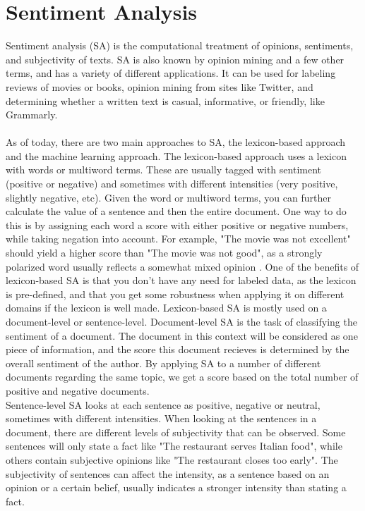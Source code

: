 \documentclass{report}
\begin{document}
\section{Sentiment Analysis}
Sentiment analysis (SA) is the computational treatment of opinions, sentiments, and subjectivity of texts. SA is also known by opinion mining and a few other terms, and has a variety of different applications. It can be used for labeling reviews of movies or books, opinion mining from sites like Twitter, and determining whether a written text is casual, informative, or friendly, like Grammarly.\\\\
As of today, there are two main approaches to SA, the lexicon-based approach and the machine learning approach. The lexicon-based approach uses a lexicon with words or multiword terms. These are usually tagged with sentiment (positive or negative) and sometimes with different intensities (very positive, slightly negative, etc). Given the word or multiword terms, you can further calculate the value of a sentence and then the entire document. One way to do this is by assigning each word a score with either positive or negative numbers, while taking negation into account. For example, "The movie was not excellent" should yield a higher score than "The movie was not good", as a strongly polarized word usually reflects a somewhat mixed opinion \cite{taboada-etal-2011-lexicon}. One of the benefits of lexicon-based SA is that you don't have any need for labeled data, as the lexicon is pre-defined, and that you get some robustness when applying it on different domains if the lexicon is well made. Lexicon-based SA is mostly used on a document-level or sentence-level. Document-level SA is the task of classifying the sentiment of a document. The document in this context will be considered as one piece of information, and the score this document recieves is determined by the overall sentiment of the author. By applying SA to a number of different documents regarding the same topic, we get a score based on the total number of positive and negative documents.\\
Sentence-level SA looks at each sentence as positive, negative or neutral, sometimes with different intensities. When looking at the sentences in a document, there are different levels of subjectivity that can be observed. Some sentences will only state a fact like "The restaurant serves Italian food", while others contain subjective opinions like "The restaurant closes too early". The subjectivity of sentences can affect the intensity, as a sentence based on an opinion or a certain belief, usually indicates a stronger intensity than stating a fact.\\
\end{document}
